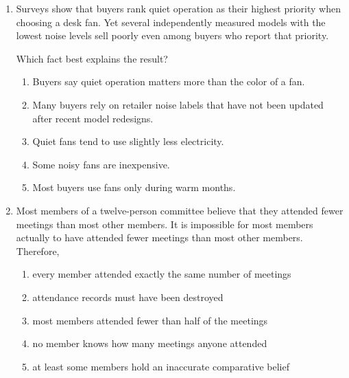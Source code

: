 \begin{enumerate}
Which completion provides the strongest support?
\begin{enumerate}
\item the springs are colder than the modern marsh
\item the shell layer also contains windblown sand
\item the snail cannot survive or reproduce outside a narrow low-salinity range
\item several other snail species live in both fresh and salty water
\item the lake existed for thousands of years
\end{enumerate}

\item Surveys show that buyers rank quiet operation as their highest priority when choosing a desk fan. Yet several independently measured models with the lowest noise levels sell poorly even among buyers who report that priority.

Which fact best explains the result?
\begin{enumerate}
\item Buyers say quiet operation matters more than the color of a fan.
\item Many buyers rely on retailer noise labels that have not been updated after recent model redesigns.
\item Quiet fans tend to use slightly less electricity.
\item Some noisy fans are inexpensive.
\item Most buyers use fans only during warm months.
\end{enumerate}

\item Most members of a twelve-person committee believe that they attended fewer meetings than most other members. It is impossible for most members actually to have attended fewer meetings than most other members. Therefore,
\begin{enumerate}
\item every member attended exactly the same number of meetings
\item attendance records must have been destroyed
\item most members attended fewer than half of the meetings
\item no member knows how many meetings anyone attended
\item at least some members hold an inaccurate comparative belief
\end{enumerate}


\end{enumerate}
